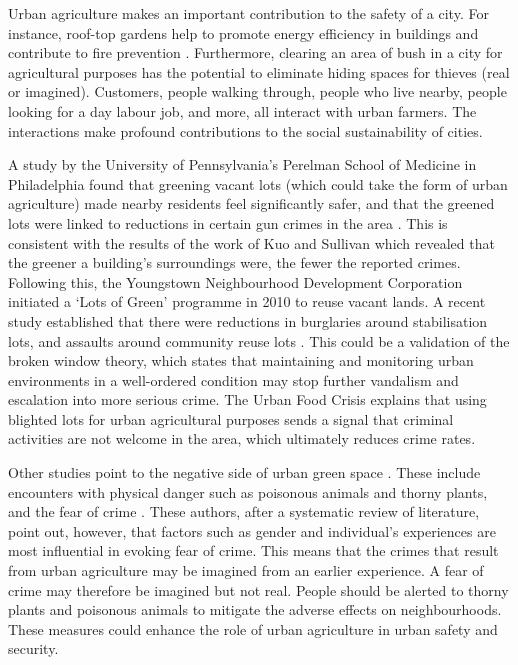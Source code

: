 Urban agriculture makes an important contribution to the safety of a city. For instance, roof-top gardens help to promote energy efficiency in buildings and contribute to fire prevention \cite{Hoornweg2012}. Furthermore, clearing an area of bush in a city for agricultural purposes has the potential to eliminate hiding spaces for thieves (real or imagined). Customers, people walking through, people who live nearby, people looking for a day labour job, and more, all interact with urban farmers. The interactions make profound contributions to the social sustainability of cities.

A study by the University of Pennsylvania's Perelman School of Medicine in Philadelphia found that greening vacant lots (which could take the form of urban agriculture) made nearby residents feel significantly safer, and that the greened lots were linked to reductions in certain gun crimes in the area \cite{Krauser2012}. This is consistent with the results of the work of Kuo and Sullivan \cite{Kuo2001} which revealed that the greener a building's surroundings were, the fewer the reported crimes. Following this, the Youngstown Neighbourhood Development Corporation initiated a ‘Lots of Green’ programme in 2010 to reuse vacant lands. A recent study established that there were reductions in burglaries around stabilisation lots, and assaults around community reuse lots \cite{Kondo2016}. This could be a validation of the broken window theory, which states that maintaining and monitoring urban environments in a well-ordered condition may stop further vandalism and escalation into more serious crime. The Urban Food Crisis \cite{TheUrbanFoodCrisis2018} explains that using blighted lots for urban agricultural purposes sends a signal that criminal activities are not welcome in the area, which ultimately reduces crime rates.

Other studies point to the negative side of urban green space \cite{Bixler1997}. These include encounters with physical danger such as poisonous animals and thorny plants, and the fear of crime \cite{Sreetheran2014}. These authors, after a systematic review of literature, point out, however, that factors such as gender and individual's experiences are most influential in evoking fear of crime. This means that the crimes that result from urban agriculture may be imagined from an earlier experience. A fear of crime may therefore be imagined but not real. People should be alerted to thorny plants and poisonous animals to mitigate the adverse effects on neighbourhoods. These measures could enhance the role of urban agriculture in urban safety and security.

